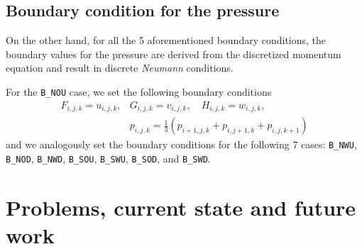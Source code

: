\documentclass[a4paper, 12pt]{article}
\begin{document}
\subsection{Boundary condition for the pressure}\label{sec:boundary_pressure}
On the other hand, for all the 5 aforementioned boundary conditions, the boundary values for the pressure are derived from the discretized momentum equation and result in discrete \textit{Neumann} conditions.

%

For the \texttt{B\_NOU} case, we set the following boundary conditions
\begin{equation}
\begin{array}{ll}
F_{i,j,k} = u_{i,j,k}, & G_{i,j,k} = v_{i,j,k}, \quad H_{i,j,k} = w_{i,j,k}, \\
 & p_{i,j,k} = \frac{1}{3}(p_{i+1,j,k}+p_{i,j+1,k}+p_{i,j,k+1})
\end{array}
\end{equation}
and we analogously set the boundary conditions for the following 7 cases: \texttt{B\_NWU}, \texttt{B\_NOD}, \texttt{B\_NWD}, \texttt{B\_SOU}, \texttt{B\_SWU}, \texttt{B\_SOD}, and \texttt{B\_SWD}.

\section{Problems, current state and future work}\label{sec:prob_state_future}
\end{document}
